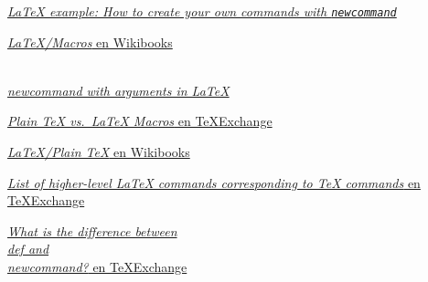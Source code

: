 \href{http://alvinalexander.com/blog/post/latex/create-your-own-commands-in-latex-using-newcommand}{\emph{LaTeX
example: How to create your own commands with \lstinline!newcommand!}}

\href{https://en.wikibooks.org/wiki/LaTeX/Macros}{\emph{LaTeX/Macros} en
Wikibooks}

\href{http://www.shawnlankton.com/2008/01/newcommand-with-argument-in-latex/}{\emph{\\newcommand
with arguments in LaTeX}}

\href{https://tex.stackexchange.com/questions/35564/plain-tex-vs-latex-macros}{\emph{Plain
TeX vs.~LaTeX Macros} en TeXExchange}

\href{https://en.wikibooks.org/wiki/LaTeX/Plain_TeX}{\emph{LaTeX/Plain
TeX} en Wikibooks}

\href{https://tex.stackexchange.com/questions/26742/list-of-higher-level-latex-commands-corresponding-to-tex-commands/26922\#26922}{\emph{List
of higher-level LaTeX commands corresponding to TeX commands} en
TeXExchange}

\href{https://tex.stackexchange.com/questions/655/what-is-the-difference-between-def-and-newcommand}{\emph{What
is the difference between \\def and \\newcommand?} en TeXExchange}
